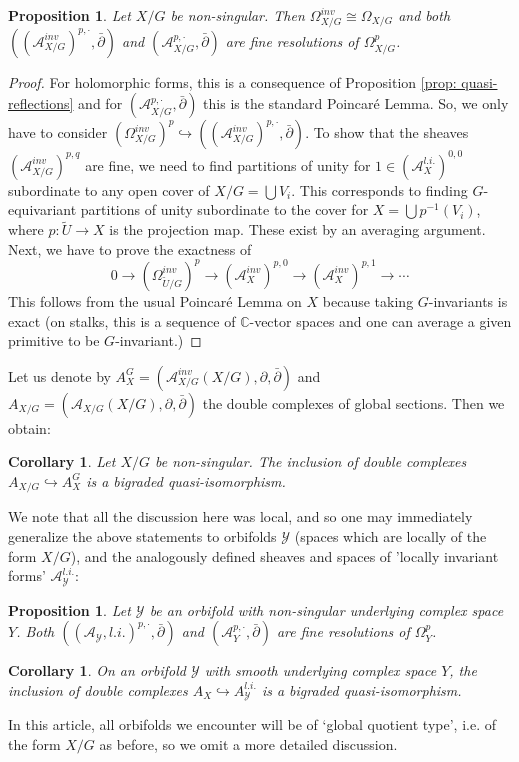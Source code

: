 \documentclass[12pt,reqno]{amsart}
\newtheorem{prop}[thm]{Proposition}
\newtheorem{cor}[thm]{Corollary}
\theoremstyle{definition}
\newcommand{\C}{\mathbb{C}}
\newcommand{\cA}{\mathcal{A}}
\newcommand{\cY}{\mathcal{Y}}
\newcommand{\del}{\partial}
\newcommand{\delbar}{\bar{\del}}
\begin{document}
\begin{prop} Let $X/G$ be non-singular. Then $\Omega^{inv}_{X/G}\cong \Omega_{X/G}$ and both $((\cA_{X/G}^{inv})^{p,\cdot},\delbar)$ and $(\cA_{X/G}^{p,\cdot},\delbar)$ are fine resolutions of $\Omega^p_{X/G}$.
\end{prop}
\begin{proof}
For holomorphic forms, this is a consequence of Proposition \ref{prop: quasi-reflections} and for $(\cA_{X/G}^{p,\cdot},\delbar)$ this is the standard Poincar\'e Lemma. So, we only have to consider $(\Omega^{inv}_{X/G})^p\hookrightarrow((\cA_{X/G}^{inv})^{p,\cdot},\delbar)$. To show that the sheaves $(\cA_{X/G}^{inv})^{p,q}$ are fine, we need to find partitions of unity for $1\in (\cA_{X}^{l.i.})^{0,0}$ subordinate to any open cover of $X/G=\bigcup V_i$. This corresponds to finding $G$-equivariant partitions of unity subordinate to the cover for $X=\bigcup p^{-1}(V_i)$, where $p:\tilde{U}\to X$ is the projection map. These exist by an averaging argument. Next, we have to prove the exactness of 
\[
0\to (\Omega_{\tilde U/G}^{inv})^p\to (\cA_X^{inv})^{p,0}\to (\cA_X^{inv})^{p,1}\to\cdots
\]
This follows from the usual Poincar\'e Lemma on $X$ because taking $G$-invariants is exact (on stalks, this is a sequence of $\C$-vector spaces and one can average a given primitive to be $G$-invariant.)
\end{proof}
Let us denote by $A_X^G=(\cA_{X/G}^{inv}(X/G),\del,\delbar)$ and $A_{X/G}=(\cA_{X/G}(X/G),\del,\delbar)$ the double complexes of global sections. Then we obtain:
\begin{cor}\label{cor: invariant bicomplex smooth case}
Let $X/G$ be non-singular. The inclusion of double complexes $A_{X/G}\hookrightarrow A_{X}^{G}$ is a bigraded quasi-isomorphism.
\end{cor}

We note that all the discussion here was local, and so one may immediately generalize the above statements to orbifolds $\cY$ (spaces which are locally of the form $X/G$), and the analogously defined sheaves and spaces of 'locally invariant forms' $\cA^{l.i.}_{\cY}$:

\begin{prop} Let $\cY$ be an orbifold with non-singular underlying complex space $Y$. Both $((\cA_\cY,{l.i.})^{p,\cdot},\delbar)$ and $(\cA_{Y}^{p,\cdot},\delbar)$ are fine resolutions of $\Omega^p_{Y}$.
\end{prop}
\begin{cor}
On an orbifold $\cY$ with smooth underlying complex space $Y$, the inclusion of double complexes $A_X\hookrightarrow A_{\cY}^{l.i.}$ is a bigraded quasi-isomorphism.
\end{cor}
In this article, all orbifolds we encounter will be of `global quotient type', i.e. of the form $X/G$ as before, so we omit a more detailed discussion.
\end{document}
